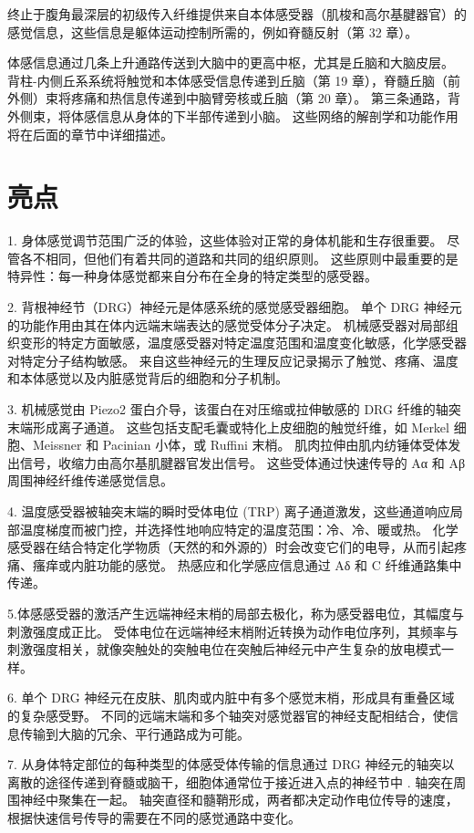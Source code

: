 终止于腹角最深层的初级传入纤维提供来自本体感受器（肌梭和高尔基腱器官）的感觉信息，这些信息是躯体运动控制所需的，例如脊髓反射（第 32 章）。

体感信息通过几条上升通路传送到大脑中的更高中枢，尤其是丘脑和大脑皮层。 背柱-内侧丘系系统将触觉和本体感受信息传递到丘脑（第 19 章），脊髓丘脑（前外侧）束将疼痛和热信息传递到中脑臂旁核或丘脑（第 20 章）。 第三条通路，背外侧束，将体感信息从身体的下半部传递到小脑。 这些网络的解剖学和功能作用将在后面的章节中详细描述。




\section{亮点}


1. 身体感觉调节范围广泛的体验，这些体验对正常的身体机能和生存很重要。 尽管各不相同，但他们有着共同的道路和共同的组织原则。 这些原则中最重要的是特异性：每一种身体感觉都来自分布在全身的特定类型的感受器。 

2. 背根神经节（DRG）神经元是体感系统的感觉感受器细胞。 单个 DRG 神经元的功能作用由其在体内远端末端表达的感觉受体分子决定。 机械感受器对局部组织变形的特定方面敏感，温度感受器对特定温度范围和温度变化敏感，化学感受器对特定分子结构敏感。 来自这些神经元的生理反应记录揭示了触觉、疼痛、温度和本体感觉以及内脏感觉背后的细胞和分子机制。 

3. 机械感觉由 Piezo2 蛋白介导，该蛋白在对压缩或拉伸敏感的 DRG 纤维的轴突末端形成离子通道。 这些包括支配毛囊或特化上皮细胞的触觉纤维，如 Merkel 细胞、Meissner 和 Pacinian 小体，或 Ruffini 末梢。 肌肉拉伸由肌内纺锤体受体发出信号，收缩力由高尔基肌腱器官发出信号。 这些受体通过快速传导的 Aα 和 Aβ 周围神经纤维传递感觉信息。 

4. 温度感受器被轴突末端的瞬时受体电位 (TRP) 离子通道激发，这些通道响应局部温度梯度而被门控，并选择性地响应特定的温度范围：冷、冷、暖或热。 化学感受器在结合特定化学物质（天然的和外源的）时会改变它们的电导，从而引起疼痛、瘙痒或内脏功能的感觉。 热感应和化学感应信息通过 Aδ 和 C 纤维通路集中传递。 

5.体感感受器的激活产生远端神经末梢的局部去极化，称为感受器电位，其幅度与刺激强度成正比。 受体电位在远端神经末梢附近转换为动作电位序列，其频率与刺激强度相关，就像突触处的突触电位在突触后神经元中产生复杂的放电模式一样。 

6. 单个 DRG 神经元在皮肤、肌肉或内脏中有多个感觉末梢，形成具有重叠区域的复杂感受野。 不同的远端末端和多个轴突对感觉器官的神经支配相结合，使信息传输到大脑的冗余、平行通路成为可能。 

7. 从身体特定部位的每种类型的体感受体传输的信息通过 DRG 神经元的轴突以离散的途径传递到脊髓或脑干，细胞体通常位于接近进入点的神经节中 . 轴突在周围神经中聚集在一起。 轴突直径和髓鞘形成，两者都决定动作电位传导的速度，根据快速信号传导的需要在不同的感觉通路中变化。 

